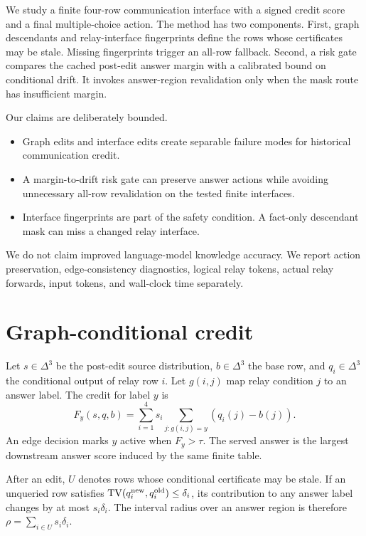 \documentclass[11pt]{article}
\begin{document}
We study a finite four-row communication interface with a signed credit score and a final multiple-choice action. The method has two components. First, graph descendants and relay-interface fingerprints define the rows whose certificates may be stale. Missing fingerprints trigger an all-row fallback. Second, a risk gate compares the cached post-edit answer margin with a calibrated bound on conditional drift. It invokes answer-region revalidation only when the mask route has insufficient margin.

Our claims are deliberately bounded.
\begin{itemize}
\item Graph edits and interface edits create separable failure modes for historical communication credit.
\item A margin-to-drift risk gate can preserve answer actions while avoiding unnecessary all-row revalidation on the tested finite interfaces.
\item Interface fingerprints are part of the safety condition. A fact-only descendant mask can miss a changed relay interface.
\end{itemize}
We do not claim improved language-model knowledge accuracy. We report action preservation, edge-consistency diagnostics, logical relay tokens, actual relay forwards, input tokens, and wall-clock time separately.

\section{Graph-conditional credit}
Let $s\in\Delta^3$ be the post-edit source distribution, $b\in\Delta^3$ the base row, and $q_i\in\Delta^3$ the conditional output of relay row $i$. Let $g(i,j)$ map relay condition $j$ to an answer label. The credit for label $y$ is
\begin{equation}
F_y(s,q,b)=\sum_{i=1}^4 s_i\sum_{j:g(i,j)=y}(q_i(j)-b(j)).
\label{eq:credit}
\end{equation}
An edge decision marks $y$ active when $F_y>\tau$. The served answer is the largest downstream answer score induced by the same finite table.

After an edit, $U$ denotes rows whose conditional certificate may be stale. If an unqueried row satisfies $\operatorname{TV}(q_i^{\rm new},q_i^{\rm old})\leq\delta_i$, its contribution to any answer label changes by at most $s_i\delta_i$. The interval radius over an answer region is therefore $\rho=\sum_{i\in U}s_i\delta_i$.
\end{document}
